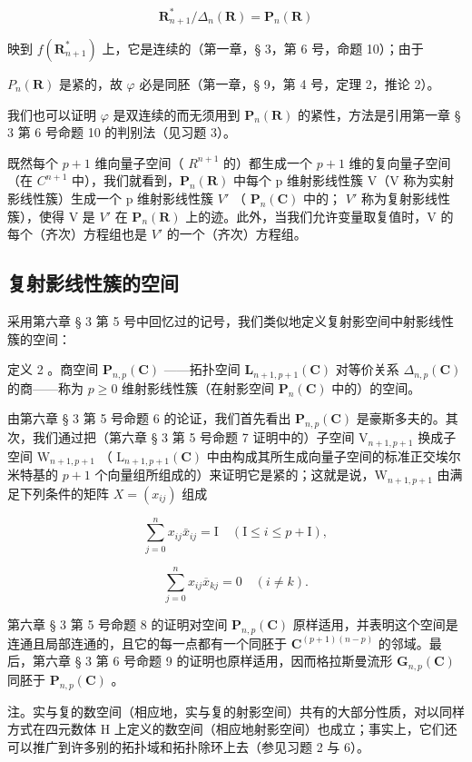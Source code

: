 \[
\mathbf {R} _ {n + 1} ^ {*} / \Delta_ {n} (\mathbf {R}) = \mathbf {P} _ {n} (\mathbf {R})
\]

映到 \(f(\mathbf{R}_{n+1}^*)\) 上，它是连续的（第一章，§ 3，第 6 号，命题 10）；由于

\(P_{n}(\mathbf{R})\) 是紧的，故 \(\varphi\) 必是同胚（第一章，§ 9，第 4 号，定理 2，推论 2）。

我们也可以证明 \(\varphi\) 是双连续的而无须用到 \(\mathbf{P}_n(\mathbf{R})\) 的紧性，方法是引用第一章 § 3 第 6 号命题 10 的判别法（见习题 3）。

既然每个 \(p + 1\) 维向量子空间（ \(R^{n+1}\) 的）都生成一个 \(p + 1\) 维的复向量子空间（在 \(C^{n+1}\) 中），我们就看到，\(\mathbf{P}_{n}(\mathbf{R})\) 中每个 p 维射影线性簇 V（V 称为实射影线性簇）生成一个 p 维射影线性簇 \(V'\) （ \(\mathbf{P}_{n}(\mathbf{C})\) 中的； \(V'\) 称为复射影线性簇），使得 V 是 \(V'\) 在 \(\mathbf{P}_{n}(\mathbf{R})\) 上的迹。此外，当我们允许变量取复值时，V 的每个（齐次）方程组也是 \(V'\) 的一个（齐次）方程组。

\subsection{复射影线性簇的空间}

采用第六章 § 3 第 5 号中回忆过的记号，我们类似地定义复射影空间中射影线性簇的空间：

定义 2 。商空间 \(\mathbf{P}_{n,p}(\mathbf{C})\) ——拓扑空间 \(\mathbf{L}_{n+1, p+1}(\mathbf{C})\) 对等价关系 \(\Delta_{n,p}(\mathbf{C})\) 的商——称为 \(p \geqslant 0\) 维射影线性簇（在射影空间 \(\mathbf{P}_n(\mathbf{C})\) 中的）的空间。

由第六章 § 3 第 5 号命题 6 的论证，我们首先看出 \(\mathbf{P}_{n,p}(\mathbf{C})\) 是豪斯多夫的。其次，我们通过把（第六章 § 3 第 5 号命题 7 证明中的）子空间 \(\mathrm{V}_{n+1,p+1}\) 换成子空间 \(\mathrm{W}_{n+1,p+1}\) （ \(\mathrm{L}_{n+1,p+1}(\mathbf{C})\) 中由构成其所生成向量子空间的标准正交埃尔米特基的 \(p+1\) 个向量组所组成的）来证明它是紧的；这就是说，\(\mathrm{W}_{n+1,p+1}\) 由满足下列条件的矩阵 \(X=(x_{ij})\) 组成

\[
\sum_ {j = 0} ^ {n} x _ {i j} \bar {x} _ {i j} = \mathrm{I} \quad (\mathrm{I} \leqslant i \leqslant p + \mathrm{I}),
\]

\[
\sum_ {j = 0} ^ {n} x _ {i j} \overline {{{x}}} _ {k j} = 0 \quad (i \neq k).
\]

第六章 § 3 第 5 号命题 8 的证明对空间 \(\mathbf{P}_{n,p}(\mathbf{C})\) 原样适用，并表明这个空间是连通且局部连通的，且它的每一点都有一个同胚于 \(\mathbf{C}^{(p+1)(n-p)}\) 的邻域。最后，第六章 § 3 第 6 号命题 9 的证明也原样适用，因而格拉斯曼流形 \(\mathbf{G}_{n,p}(\mathbf{C})\) 同胚于 \(\mathbf{P}_{n,p}(\mathbf{C})\) 。

注。实与复的数空间（相应地，实与复的射影空间）共有的大部分性质，对以同样方式在四元数体 H 上定义的数空间（相应地射影空间）也成立；事实上，它们还可以推广到许多别的拓扑域和拓扑除环上去（参见习题 2 与 6）。

\ExerciseGroupsStart

